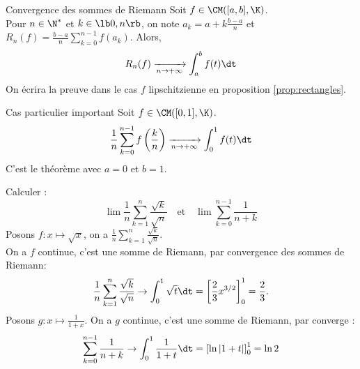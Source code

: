 \documentclass[11pt]{article}
\begin{document}
\begin{thm}{Convergence des sommes de Riemann}{}
    Soit $f\in\CM([a,b], \K)$.\\
    Pour $n\in\N^*$ et $k\in\lb0,n\rb$, on note $a_k=a+k\frac{b-a}{n}$ et $R_n(f)=\frac{b-a}{n}\sum_{k=0}^{n-1}f(a_k)$. Alors,
    \begin{equation*}
        R_n(f)\xrightarrow[n\to+\infty]{}\int_a^bf(t)\dt
    \end{equation*}
    \tcblower
    On écrira la preuve dans le cas $f$ lipschitzienne en proposition \ref{prop:rectangles}.
\end{thm}

\begin{corr}{Cas particulier important}{}
    Soit $f\in\CM([0,1], \K)$.
    \begin{equation*}
        \frac{1}{n}\sum_{k=0}^{n-1}f\left(\frac{k}{n}\right)\xrightarrow[n\to+\infty]{}\int_0^1f(t)\dt
    \end{equation*}
    \tcblower
    C'est le théorème avec $a=0$ et $b=1$.
\end{corr}

\begin{ex}{}{}
    Calculer :
    \begin{equation*}
        \lim\frac{1}{n}\sum_{k=1}^n\frac{\sqrt{k}}{\sqrt{n}} \quad \text{et}  \quad \lim\sum_{k=0}^{n-1}\frac{1}{n+k}
    \end{equation*}
    \tcblower
    Posons $f:x\mapsto\sqrt{x}$, on a $\frac{1}{n}\sum_{k=1}^n\frac{\sqrt{k}}{\sqrt{n}}$.\\
    On a $f$ continue, c'est une somme de Riemann, par convergence des sommes de Riemann:
    \begin{equation*}
        \frac{1}{n}\sum_{k=1}^n\frac{\sqrt{k}}{\sqrt{n}}\to\int_0^1\sqrt{t}\dt=\left[ \frac{2}{3}x^{3/2} \right]_0^1=\frac{2}{3}.
    \end{equation*}
    Posons $g:x\mapsto\frac{1}{1+x}$. On a $g$ continue, c'est une somme de Riemann, par converge :
    \begin{equation*}
        \sum_{k=0}^{n-1}\frac{1}{n+k}\to\int_0^1\frac{1}{1+t}\dt=\left[ \ln|1+t| \right]_0^1=\ln2
    \end{equation*}
\end{ex}
\end{document}
